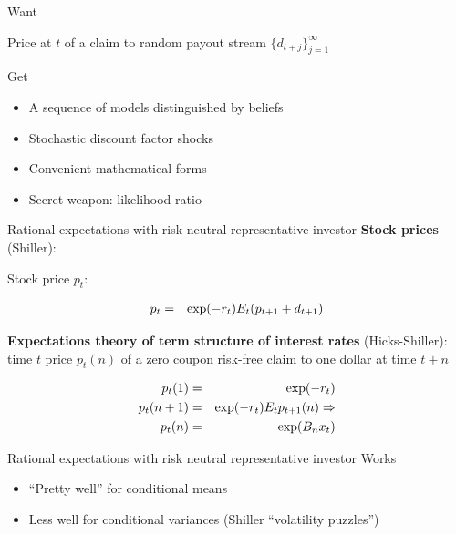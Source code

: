 \documentclass{beamer}
\theoremstyle{Definition}
\begin{document}
\begin{frame}{Want}

Price at $t$ of a claim to  random payout stream $\{d_{t+j}\}_{j=1}^\infty$


\end{frame}

\begin{frame}{Get}

\begin{itemize}
\item A sequence of models distinguished by beliefs
\item Stochastic discount factor shocks
\item Convenient mathematical forms
\item Secret weapon: likelihood ratio
\end{itemize}

\end{frame}



\begin{frame}{Rational expectations with risk neutral representative investor}
\textbf{Stock prices} (Shiller):

Stock price $p_t$:

\begin{eqnarray*}
p_t & =  & \exp(-r_t) E_t (p_{t+1} + d_{t+1}) \cr
\end{eqnarray*}


\textbf{Expectations theory of term structure of interest rates} (Hicks-Shiller):
time $t$ price $p_t(n)$ of a zero coupon   risk-free claim to one dollar at time $t+n$

\begin{eqnarray*}
p_t(1) &= &\exp(- r_t) \cr
p_t(n+1) & = & \exp(-r_t) E_t p_{t+1}(n)  \Rightarrow \cr
p_t(n) & = & \exp(B_n x_t)
\end{eqnarray*}

\end{frame}



\begin{frame}{Rational expectations with risk neutral representative investor}
Works
\begin{itemize}
\item ``Pretty well'' for conditional means
\item Less well for  conditional variances (Shiller ``volatility puzzles'')
\end{itemize}
\end{frame}
\end{document}
